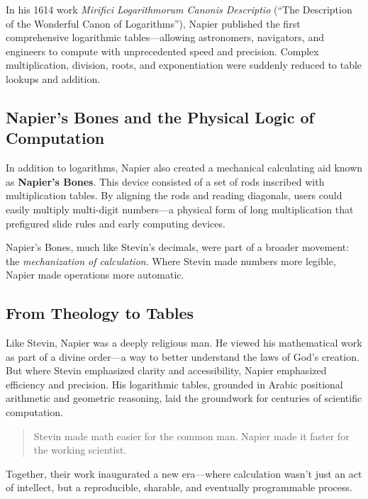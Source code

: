 In his 1614 work \textit{Mirifici Logarithmorum Canonis Descriptio} (“The Description of the Wonderful Canon of Logarithms”), Napier published the first comprehensive logarithmic tables—allowing astronomers, navigators, and engineers to compute with unprecedented speed and precision. Complex multiplication, division, roots, and exponentiation were suddenly reduced to table lookups and addition.

\subsection{Napier’s Bones and the Physical Logic of Computation}

In addition to logarithms, Napier also created a mechanical calculating aid known as \textbf{Napier’s Bones}. This device consisted of a set of rods inscribed with multiplication tables. By aligning the rods and reading diagonals, users could easily multiply multi-digit numbers—a physical form of long multiplication that prefigured slide rules and early computing devices.

Napier’s Bones, much like Stevin’s decimals, were part of a broader movement: the \textit{mechanization of calculation}. Where Stevin made numbers more legible, Napier made operations more automatic.

\subsection{From Theology to Tables}

Like Stevin, Napier was a deeply religious man. He viewed his mathematical work as part of a divine order—a way to better understand the laws of God’s creation. But where Stevin emphasized clarity and accessibility, Napier emphasized efficiency and precision. His logarithmic tables, grounded in Arabic positional arithmetic and geometric reasoning, laid the groundwork for centuries of scientific computation.

\begin{quote}
Stevin made math easier for the common man. Napier made it faster for the working scientist.
\end{quote}

Together, their work inaugurated a new era—where calculation wasn’t just an act of intellect, but a reproducible, sharable, and eventually programmable process.


